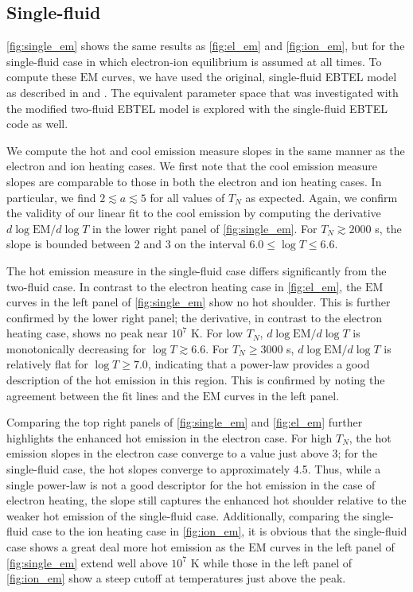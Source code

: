 \documentclass[apj]{emulateapj}
\begin{document}
	\subsection{Single-fluid}
	\label{subsec:single_heating}
	\par \autoref{fig:single_em} shows the same results as \autoref{fig:el_em} and \autoref{fig:ion_em}, but for the single-fluid case in which electron-ion equilibrium is assumed at all times. To compute these $\mathrm{EM}$ curves, we have used the original, single-fluid EBTEL model as described in \citet{klimchuk_highly_2008} and \citet{cargill_enthalpy-based_2012}. The equivalent parameter space that was investigated with the modified two-fluid EBTEL model is explored with the single-fluid EBTEL code as well.
	\par We compute the hot and cool emission measure slopes in the same manner as the electron and ion heating cases. We first note that the cool emission measure slopes are comparable to those in both the electron and ion heating cases. In particular, we find $2\lesssim a\lesssim5$ for all values of $T_N$ as expected. Again, we confirm the validity of our linear fit to the cool emission by computing the derivative $d\log{\mathrm{EM}}/d\log{T}$ in the lower right panel of \autoref{fig:single_em}. For $T_N\gtrsim2000$ s, the slope is bounded between 2 and 3 on the interval $6.0\le\log{T}\le6.6$. 
	\par The hot emission measure in the single-fluid case differs significantly from the two-fluid case. In contrast to the electron heating case in \autoref{fig:el_em}, the $\mathrm{EM}$ curves in the left panel of \autoref{fig:single_em} show no hot shoulder. This is further confirmed by the lower right panel; the derivative, in contrast to the electron heating case, shows no peak near $10^7$ K. For low $T_N$, $d\log{\mathrm{EM}}/d\log{T}$ is monotonically decreasing for $\log{T}\gtrsim6.6$. For $T_N\ge3000$ s, $d\log{\mathrm{EM}}/d\log{T}$ is relatively flat for $\log{T}\ge7.0$, indicating that a power-law provides a good description of the hot emission in this region. This is confirmed by noting the agreement between the fit lines and the $\mathrm{EM}$ curves in the left panel.
	\par Comparing the top right panels of \autoref{fig:single_em} and \autoref{fig:el_em} further highlights the enhanced hot emission in the electron case. For high $T_N$, the hot emission slopes in the electron case converge to a value just above 3; for the single-fluid case, the hot slopes converge to approximately 4.5. Thus, while a single power-law is not a good descriptor for the hot emission in the case of electron heating, the slope still captures the enhanced hot shoulder relative to the weaker hot emission of the single-fluid case. Additionally, comparing the single-fluid case to the ion heating case in \autoref{fig:ion_em}, it is obvious that the single-fluid case shows a great deal more hot emission as the $\mathrm{EM}$ curves in the left panel of \autoref{fig:single_em} extend well above $10^7$ K while those in the left panel of \autoref{fig:ion_em} show a steep cutoff at temperatures just above the peak.
\end{document}
